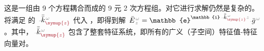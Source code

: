 这是一组由 9 个方程耦合而成的 9 元 2 次方程组。对它进行求解仍然是复杂的\cite{sturmElectromagneticWavesCrystals2024}。将满足  的 $\Xint{\begin{smallmatrix} ~ \\ {}^{}_{\mathcolor{gray}{-}} \\ ~ \end{smallmatrix}}{15}{\bar{\bar{k}}}_{\textcolor{Maroon}{\symup{z}}}^{\;\! \mathcolor{gray}{\omega}}$ 代入 ，即得到解 $\Xint{\mathcolor{gray}{-}}{25}{\bar{E}}^{\;\!\mathcolor{gray}{\omega}}_{\;\! \mathcolor{gray}{z}} = \mathbb{e}^{\mathbb{i} \Xint{\begin{smallmatrix} ~ \\ {}^{}_{\mathcolor{gray}{-}} \\ ~ \end{smallmatrix}}{15}{\bar{\bar{k}}}_{\textcolor{Maroon}{\symup{z}}}^{\;\! \mathcolor{gray}{\omega}} \mathcolor{gray}{z}} \Xint{{}^{}_{\mathcolor{gray}{-}}}{10}{\bar{g}}^{\;\!\mathcolor{gray}{\omega}}$。其中，$\Xint{\begin{smallmatrix} ~ \\ {}^{}_{\mathcolor{gray}{-}} \\ ~ \end{smallmatrix}}{15}{\bar{\bar{k}}}_{\textcolor{Maroon}{\symup{z}}}^{\;\! \mathcolor{gray}{\omega}}$ 包含了整套\textcolor{PineGreen}{特征系统}，即所有的广义（子空间）\textcolor{PineGreen}{特征值}-\textcolor{PineGreen}{特征向量}对\cite{xieAnalytic3DVector}。

